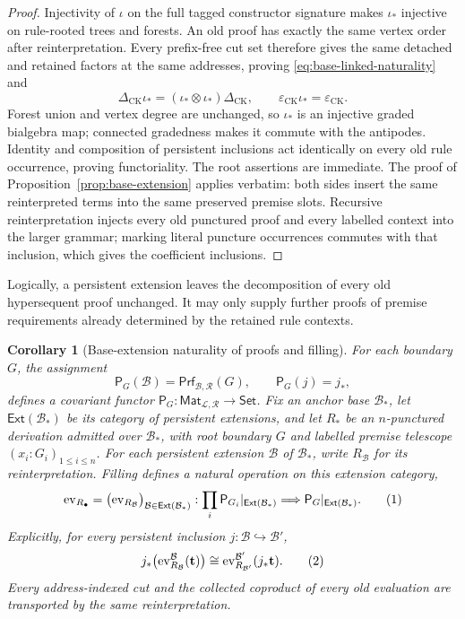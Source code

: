 \documentclass[10pt,a4paper]{article}
\theoremstyle{plain}
\newtheorem{corollary}[theorem]{Corollary}
\theoremstyle{definition}
\theoremstyle{remark}
\newcommand{\Base}{\mathcal B}
\newcommand{\Rules}{\mathcal R}
\newcommand{\Lang}{\mathcal L}
\newcommand{\DeltaCK}{\Delta_{\mathrm{CK}}}
\newcommand{\epsCK}{\varepsilon_{\mathrm{CK}}}
\newcommand{\Prf}{\mathsf{Prf}}
\newcommand{\eqtag}{\refstepcounter{equation}\tag{\theequation}}
\begin{document}
\begin{proof}
Injectivity of \(\iota\) on the full tagged constructor signature makes
\(\iota_*\) injective on
rule-rooted trees and forests.  An old proof has exactly the same vertex
order after reinterpretation.  Every prefix-free cut set therefore gives
the same detached and retained factors at the same addresses, proving
\eqref{eq:base-linked-naturality} and
\[
 \DeltaCK \iota_*=(\iota_*\otimes \iota_*)\DeltaCK,
 \qquad
 \epsCK \iota_*=\epsCK .
\]
Forest union and vertex degree are unchanged, so \(\iota_*\) is an injective
graded bialgebra map; connected gradedness makes it commute with the
antipodes.  Identity and composition of persistent inclusions act
identically on every old rule occurrence, proving functoriality.  The root
assertions are immediate.  The proof of
Proposition~\ref{prop:base-extension} applies verbatim: both sides insert
the same reinterpreted terms into the same preserved premise slots.
Recursive reinterpretation injects every old punctured proof and every
labelled context into the larger grammar; marking literal puncture
occurrences commutes with that inclusion, which gives the coefficient
inclusions.
\end{proof}

Logically, a persistent extension leaves the decomposition of every old
hypersequent proof unchanged.  It may only supply further proofs of premise
requirements already determined by the retained rule contexts.

\begin{corollary}[Base-extension naturality of proofs and filling]
\label{cor:proof-fibre-parametricity}
For each boundary \(G\), the assignment
\[
 \mathsf P_G(\Base)=\Prf_{\Base,\Rules}(G),
 \qquad
 \mathsf P_G(j)=j_*,
\]
defines a covariant functor
\(\mathsf P_G:\mathsf{Mat}_{\Lang,\Rules}\to\mathsf{Set}\).
Fix an anchor base \(\Base_\ast\), let
\(\mathsf{Ext}(\Base_\ast)\) be its category of persistent extensions, and
let \(R_\ast\) be an \(n\)-punctured derivation admitted over
\(\Base_\ast\), with root boundary \(G\) and labelled premise telescope
\((x_i:G_i)_{1\le i\le n}\).  For each persistent extension \(\Base\) of
\(\Base_\ast\), write
\(R_{\Base}\) for its reinterpretation.  Filling defines a natural
operation on this extension category,
\[
 \operatorname{ev}_{R_\bullet}
   =\bigl(\operatorname{ev}_{R_{\Base}}\bigr)_
         {\Base\in\mathsf{Ext}(\Base_\ast)}:
 \prod_i\mathsf P_{G_i}|_{\mathsf{Ext}(\Base_\ast)}
 \Longrightarrow
 \mathsf P_G|_{\mathsf{Ext}(\Base_\ast)} .
\eqtag\label{eq:proof-fibre-natural-operation}
\]
Explicitly, for every persistent inclusion
\(j:\Base\hookrightarrow\Base'\),
\[
 j_*\!\left(\operatorname{ev}^{\Base}_{R_{\Base}}(\mathbf t)\right)
 \cong
 \operatorname{ev}^{\Base'}_{R_{\Base'}}(j_*\mathbf t).
\eqtag\label{eq:proof-fibre-naturality}
\]
Every address-indexed cut and the collected coproduct of every old
evaluation are transported by the same reinterpretation.
\end{corollary}
\end{document}
